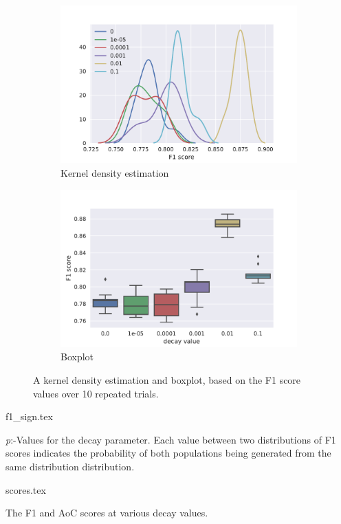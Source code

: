 \begin{figure}[htbp]
  \centering
  \begin{subfigure}[t]{0.49\textwidth}
    \centering
    \includegraphics[width=\textwidth]{./figures/results/decay/kde_f1.pdf}
    \caption{Kernel density estimation}%
    \label{fig:decay_kde}
  \end{subfigure}
  \begin{subfigure}[t]{0.49\textwidth}
    \centering
    \includegraphics[width=\textwidth]{./figures/results/decay/boxplot_f1.pdf}
    \caption{Boxplot}%
    \label{fig:decay_box}
  \end{subfigure}
  \caption{A kernel density estimation and boxplot, based on the F1 score values
  over 10 repeated trials.}%
  \label{fig:decay_dists}
\end{figure}

\begin{table}[htb]
  \centering
  {f1_sign.tex}
  \caption{\emph{p}:-Values for the decay parameter. Each value between two
    distributions of F1 scores indicates the probability of both populations
    being generated from the same distribution distribution.}%
  \label{tbl:decay_p}
\end{table}

\begin{table}[htb]
  \centering
  {scores.tex}
  \caption{The F1 and AoC scores at various decay values.}%
  \label{tbl:decay}
\end{table}

\FloatBarrier%

